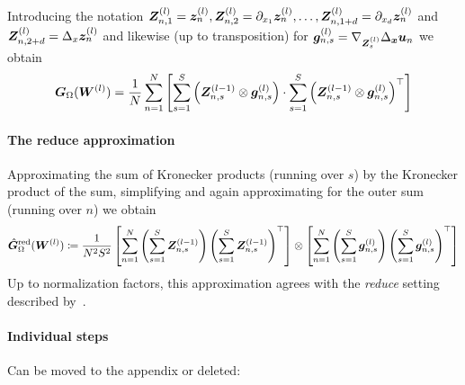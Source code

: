 Introducing the notation ${\bm{Z}}_{n, 1}^{(l)} = {\bm{z}}_n^{(l)}, {\bm{Z}}_{n, 2}^{(l)} = \partial_{x_1}{\bm{z}}_n^{(l)}, \dots, {\bm{Z}}_{n, 1+d}^{(l)} = \partial_{x_d}{\bm{z}}_n^{(l)}$ and ${\bm{Z}}_{n, 2+d}^{(l)} = \Delta_x{\bm{z}}_n^{(l)}$ and likewise (up to transposition) for ${\bm{g}}_{n, s}^{(l)} = \nabla_{{\bm{Z}}_{s}^{(l)}} \Delta_{\bm{x}}{\bm{u}}_n$ we obtain
\begin{equation}\label{eq:laplace_gramian_block_exact}
    {\bm{G}}_\Omega({\bm{W}}^{(l)}) 
    =
    \frac1N\sum_{n=1}^N
    \left[\sum_{s=1}^S \left( {\bm{Z}}^{(l-1)}_{n,s}\otimes {\bm{g}}_{n,s}^{(l)} \right)
    \cdot
    \sum_{s=1}^S \left( {\bm{Z}}
    ^{(l-1)}_{n,s}\otimes {\bm{g}}_{n,s}^{(l)} \right)^\top\right] 
\end{equation}

%

\paragraph{The reduce approximation}
Approximating the sum of Kronecker products (running over $s$) by the Kronecker product of the sum, simplifying and again approximating for the outer sum (running over $n$) we obtain
\begin{align}
    \hat{{\bm{G}}}_\Omega^{\textup{red}}({\bm{W}}^{(l)}) 
    \coloneqq
    \frac{1}{N^2 S^2} \left[\sum_{n=1}^N \left( \sum_{s=1}^S {\bm{Z}}^{(l-1)}_{n,s} \right) \left(\sum_{s=1}^S {{\bm{Z}}^{(l-1)}_{n,s}}\right)^\top\right]
    \otimes
    \left[\sum_{n=1}^N\left(\sum_{s=1}^S {\bm{g}}^{(l)}_{n,s} \right) \left( \sum_{s=1}^S {{\bm{g}}^{(l)}_{n,s}} \right)^\top \right] 
\end{align}
Up to normalization factors, this approximation agrees with the \emph{reduce} setting described by~\citet{eschenhagen2023kroneckerfactored}.

\paragraph{Individual steps} Can be moved to the appendix or deleted: 

